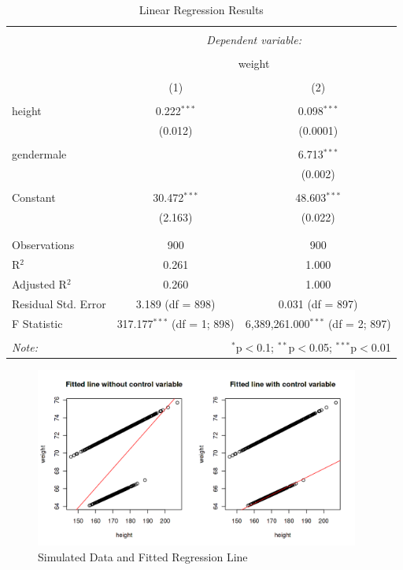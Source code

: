 \documentclass[11pt]{article}
\theoremstyle{definition}
\begin{document}
\begin{table}[!htbp] \centering 
  \caption{Linear Regression Results} 
  \label{} 
\begin{tabular}{@{\extracolsep{5pt}}lcc} 
\\[-1.8ex]\hline 
\hline \\[-1.8ex] 
 & \multicolumn{2}{c}{\textit{Dependent variable:}} \\ 
\cline{2-3} 
\\[-1.8ex] & \multicolumn{2}{c}{weight} \\ 
\\[-1.8ex] & (1) & (2)\\ 
\hline \\[-1.8ex] 
 height & 0.222$^{***}$ & 0.098$^{***}$ \\ 
  & (0.012) & (0.0001) \\ 
  & & \\ 
 gendermale &  & 6.713$^{***}$ \\ 
  &  & (0.002) \\ 
  & & \\ 
 Constant & 30.472$^{***}$ & 48.603$^{***}$ \\ 
  & (2.163) & (0.022) \\ 
  & & \\ 
\hline \\[-1.8ex] 
Observations & 900 & 900 \\ 
R$^{2}$ & 0.261 & 1.000 \\ 
Adjusted R$^{2}$ & 0.260 & 1.000 \\ 
Residual Std. Error & 3.189 (df = 898) & 0.031 (df = 897) \\ 
F Statistic & 317.177$^{***}$ (df = 1; 898) & 6,389,261.000$^{***}$ (df = 2; 897) \\ 
\hline 
\hline \\[-1.8ex] 
\textit{Note:}  & \multicolumn{2}{r}{$^{*}$p$<$0.1; $^{**}$p$<$0.05; $^{***}$p$<$0.01} \\ 
\end{tabular} 
\end{table} 

\begin{figure}[!htbp]
  \centering
  \includegraphics[width=0.95\textwidth]{./figures/reg_figure2.png}
  \caption{Simulated Data and Fitted Regression Line}
\end{figure}
\end{document}
